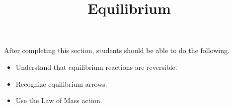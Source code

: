 \documentclass{ximera}
\title{Equilibrium}
\begin{document}
\begin{abstract}
\end{abstract}

\maketitle


After completing this section, students should be able to do the following.

\begin{itemize}
\item Understand that equilibrium reactions are reversible.
\item Recognize equilibrium arrows. 
\item Use the Law of Mass action.

\end{itemize}

\end{document}
